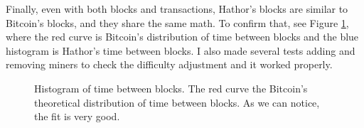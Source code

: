 Finally, even with both blocks and transactions, Hathor's blocks are similar to Bitcoin's blocks, and they share the same math. To confirm that, see Figure \ref{fig:hathor-tbb}, where the red curve is Bitcoin's distribution of time between blocks and the blue histogram is Hathor's time between blocks. I also made several tests adding and removing miners to check the difficulty adjustment and it worked properly.

\begin{figure}[!htb]
\centering
{}

\caption{Histogram of time between blocks. The red curve the Bitcoin's theoretical distribution of time between blocks. As we can notice, the fit is very good. \label{fig:hathor-tbb}}
\end{figure}

\clearpage

